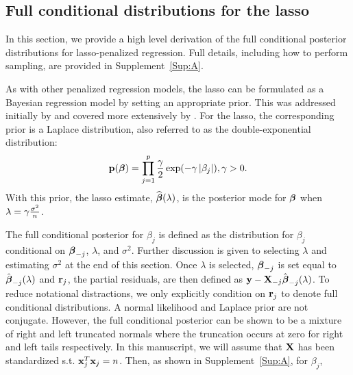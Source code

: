 \subsection{Full conditional distributions for the lasso}
\label{Sec:full-cond}

In this section, we provide a high level derivation of the full conditional posterior distributions for lasso-penalized regression. Full details, including how to perform sampling, are provided in Supplement~\ref{Sup:A}.

As with other penalized regression models, the lasso can be formulated as a Bayesian regression model by setting an appropriate prior. This was addressed initially by \cite{Tibshirani1996} and covered more extensively by \cite{Park2008}. For the lasso, the corresponding prior is a Laplace distribution, also referred to as the double-exponential distribution: $$\mathbf{p}(\boldsymbol{\beta}) = \prod_{j = 1}^{p} \frac{\gamma}{2}\exp(-\gamma \left\lvert\beta_j\right\rvert), \gamma > 0.$$ With this prior, the lasso estimate, $\widehat{\boldsymbol{\beta}}(\lambda)$, is the posterior mode for $\boldsymbol{\beta}$ when $\lambda = \gamma \frac{\sigma^2}{n}$.

The full conditional posterior for $\beta_j$ is defined as the distribution for $\beta_j$ conditional on $\boldsymbol{\beta}_{-j}$, $\lambda$, and $\sigma^2$. Further discussion is given to selecting $\lambda$ and estimating $\sigma^2$ at the end of this section. Once $\lambda$ is selected, $\boldsymbol{\beta}_{-j}$ is set equal to $\hat{\boldsymbol{\beta}}_{-j}(\lambda)$ and $\mathbf{r}_{j}$, the partial residuals, are then defined as $\mathbf{y} - \mathbf{X}_{-j}\hat{\boldsymbol{\beta}}_{-j}(\lambda)$. To reduce notational distractions, we only explicitly condition on $\mathbf{r}_{j}$ to denote full conditional distributions. A normal likelihood and Laplace prior are not conjugate. However, the full conditional posterior can be shown to be a mixture of right and left truncated normals where the truncation occurs at zero for right and left tails respectively. In this manuscript, we will assume that $\mathbf{X}$ has been standardized s.t. $\mathbf{x}_j^T\mathbf{x}_j = n$. Then, as shown in Supplement~\ref{Sup:A}, for $\beta_j$,


